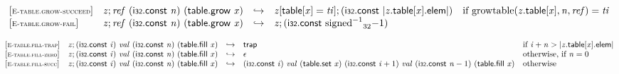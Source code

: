 \vspace{1ex}

$$
\begin{array}{@{}l@{}lcl@{}l@{}}
{[\textsc{\scriptsize E{-}table.grow{-}succeed}]} \quad & {\mathit{z}} ; {\mathit{ref}}~(\mathsf{i{\scriptstyle32}}.\mathsf{const}~{\mathit{n}})~(\mathsf{table.grow}~{\mathit{x}}) &\hookrightarrow& {\mathit{z}}{}[\mathsf{table}{}[{\mathit{x}}] = {\mathit{ti}}] ; (\mathsf{i{\scriptstyle32}}.\mathsf{const}~{|{{\mathit{z}}.\mathsf{table}}{{}[{\mathit{x}}]}.\mathsf{elem}|}) &\quad
  \mbox{if}~{\mathrm{growtable}}({{\mathit{z}}.\mathsf{table}}{{}[{\mathit{x}}]}, {\mathit{n}}, {\mathit{ref}}) = {\mathit{ti}} \\
{[\textsc{\scriptsize E{-}table.grow{-}fail}]} \quad & {\mathit{z}} ; {\mathit{ref}}~(\mathsf{i{\scriptstyle32}}.\mathsf{const}~{\mathit{n}})~(\mathsf{table.grow}~{\mathit{x}}) &\hookrightarrow& {\mathit{z}} ; (\mathsf{i{\scriptstyle32}}.\mathsf{const}~{{{{{\mathrm{signed}}^{{-1}}}}{}}_{32}}{{-1}}) &  \\
\end{array}
$$

\vspace{1ex}

$$
\begin{array}{@{}l@{}lcl@{}l@{}}
{[\textsc{\scriptsize E{-}table.fill{-}trap}]} \quad & {\mathit{z}} ; (\mathsf{i{\scriptstyle32}}.\mathsf{const}~{\mathit{i}})~{\mathit{val}}~(\mathsf{i{\scriptstyle32}}.\mathsf{const}~{\mathit{n}})~(\mathsf{table.fill}~{\mathit{x}}) &\hookrightarrow& \mathsf{trap} &\quad
  \mbox{if}~{\mathit{i}} + {\mathit{n}} > {|{{\mathit{z}}.\mathsf{table}}{{}[{\mathit{x}}]}.\mathsf{elem}|} \\
{[\textsc{\scriptsize E{-}table.fill{-}zero}]} \quad & {\mathit{z}} ; (\mathsf{i{\scriptstyle32}}.\mathsf{const}~{\mathit{i}})~{\mathit{val}}~(\mathsf{i{\scriptstyle32}}.\mathsf{const}~{\mathit{n}})~(\mathsf{table.fill}~{\mathit{x}}) &\hookrightarrow& \epsilon &\quad
  \mbox{otherwise, if}~{\mathit{n}} = 0 \\
{[\textsc{\scriptsize E{-}table.fill{-}succ}]} \quad & {\mathit{z}} ; (\mathsf{i{\scriptstyle32}}.\mathsf{const}~{\mathit{i}})~{\mathit{val}}~(\mathsf{i{\scriptstyle32}}.\mathsf{const}~{\mathit{n}})~(\mathsf{table.fill}~{\mathit{x}}) &\hookrightarrow& (\mathsf{i{\scriptstyle32}}.\mathsf{const}~{\mathit{i}})~{\mathit{val}}~(\mathsf{table.set}~{\mathit{x}})~(\mathsf{i{\scriptstyle32}}.\mathsf{const}~{\mathit{i}} + 1)~{\mathit{val}}~(\mathsf{i{\scriptstyle32}}.\mathsf{const}~{\mathit{n}} - 1)~(\mathsf{table.fill}~{\mathit{x}}) &\quad
  \mbox{otherwise} \\
\end{array}
$$

